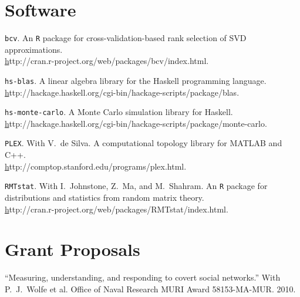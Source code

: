 \documentclass[overlapped,line,letterpaper]{res}
\begin{document}
\begin{resume}


\section{\bf Software}

{\texttt{bcv}}.
An \texttt{R} package for
cross-validation-based rank selection of SVD approximations. \\
\href{http://cran.r-project.org/web/packages/bcv/index.html}http://cran.r-project.org/web/packages/bcv/index.html.

{\texttt{hs-blas}}.
A linear algebra library for the Haskell programming language. \\
\href{http://hackage.haskell.org/cgi-bin/hackage-scripts/package/blas}http://hackage.haskell.org/cgi-bin/hackage-scripts/package/blas.

{\texttt{hs-monte-carlo}}.
A Monte Carlo simulation library for Haskell. \\
\href{http://hackage.haskell.org/cgi-bin/hackage-scripts/package/monte-carlo}http://hackage.haskell.org/cgi-bin/hackage-scripts/package/monte-carlo.

{\texttt{PLEX}}. With V.\ de Silva.
A computational topology library for \textsc{MATLAB} and C++.  \\
\href{http://comptop.stanford.edu/programs/plex.html}http://comptop.stanford.edu/programs/plex.html.

{\texttt{RMTstat}}. With I.\ Johnstone, Z.\ Ma, and M.\ Shahram.
An \texttt{R} package for distributions and statistics from random matrix theory. \\
\href{http://cran.r-project.org/web/packages/RMTstat/index.html}http://cran.r-project.org/web/packages/RMTstat/index.html.



\section{\bf Grant Proposals}

``Measuring, understanding, and responding to covert social networks.''
With P.\ J.\ Wolfe et al.
Office of Naval Research MURI Award 58153-MA-MUR.
2010.


\end{resume}
\end{document}
